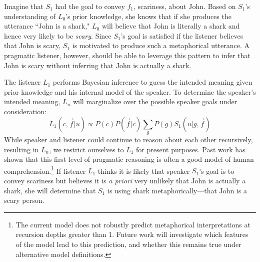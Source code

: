 \documentclass[10pt,letterpaper]{article}
\begin{document}
%

Imagine that $S_1$ had the goal to convey $f_1$, scariness, about John.
Based on $S_1$'s understanding of $L_0$'s prior knowledge, she knows that if she produces the utterance ``John is a shark," $L_0$ will believe that John is literally a shark and hence very likely to be \emph{scary}. Since $S_1$'s goal is satisfied if the listener believes that John is scary, $S_1$ is motivated to produce such a metaphorical utterance. A pragmatic listener, however, should be able to leverage this pattern to infer that John is scary without inferring that John is actually a shark.


The listener $L_1$ performs Bayesian inference to guess the intended meaning given prior knowledge and his internal model of the speaker. To determine the speaker's intended meaning, $L_n$ will marginalize over the possible speaker goals under consideration:
$$
L_1 (c, \vec f | u) \propto P(c) P(\vec f | c) \sum_{g}{P (g) S_1 (u|g, \vec f)}
$$
While speaker and listener could continue to reason about each other recursively, resulting in $L_n$, we restrict ourselves to $L_1$ for present purposes. Past work has shown that this first level of pragmatic reasoning is often a good model of human comprehension.\footnote{The current model does not robustly predict metaphorical interpretations at recursion depths greater than 1. Future work will investigate which features of the model lead to this prediction, and whether this remains true under alternative model definitions.}
If listener $L_1$ thinks it is likely that speaker $S_1$'s goal is to convey scariness but believes it is \emph{a priori} very unlikely that John is actually a shark, she will determine that $S_1$ is using shark metaphorically---that John is a scary person.
\end{document}
